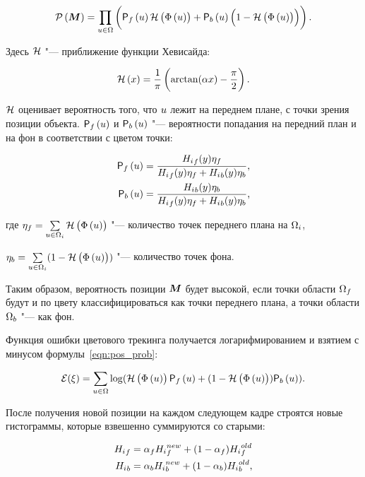\begin{equation}
\label{eqn:pos_prob}
    \mathcal{P} \left( \bm{M} \right)  = \prod\limits_{\mathnormal{u} \in \Omega} \left(
        \mathsf{P}_f \left( \mathnormal{u} \right) \mathcal{H} \left( \Phi \left( \mathnormal{u} \right) \right)
        + \mathsf{P}_b \left( \mathnormal{u} \right) \left( 1 - \mathcal{H} \left( \Phi \left( \mathnormal{u} \right) \right) \right)
    \right)
\text{.}
\end{equation}

Здесь $\mathcal{H}$ "--- приближение функции Хевисайда:

\begin{equation}
\label{eqn:heaviside}
    \mathcal{H} \left( x \right) = \frac{1}{\pi} \left( \arctan(\alpha x) - \frac{\pi}{2} \right)
\text{.}
\end{equation}

$\mathcal{H}$ оценивает вероятность того, что $\mathnormal{u}$ лежит на переднем плане, с точки
зрения позиции объекта.
$\mathsf{P}_f \left( \mathnormal{u} \right)$ и $\mathsf{P}_b \left( \mathnormal{u} \right)$ "--- вероятности попадания на передний план и 
на фон в соответствии с цветом точки:

\begin{align}
\label{eqn:Pfu}
    \mathsf{P}_f \left( \mathnormal{u} \right) &= \frac{{H_i}_f(y)\eta_f}{{H_i}_f(y)\eta_f +
        {H_i}_b(y)\eta_b} \text{,} \\
    \mathsf{P}_b \left( \mathnormal{u} \right) &=\frac{{H_i}_b(y)\eta_b}{{H_i}_f(y)\eta_f +
        {H_i}_b(y)\eta_b} \text{,}
\end{align}

где
$
    \eta_f = \sum\limits_{\mathnormal{u} \in \Omega_i}\mathcal{H} \left( \Phi \left( \mathnormal{u} \right) \right)
$ "--- количество точек переднего плана на $\Omega_i$,

$
    \eta_b = \sum\limits_{\mathnormal{u} \in \Omega_i}(1 - \mathcal{H} \left( \Phi \left( \mathnormal{u} \right) \right))
$ "--- количество точек фона.


Таким образом, вероятность позиции $\bm{M}$ будет высокой, если точки области
$\Omega_f$ будут и по цвету классифицироваться как точки переднего плана, а
точки области $\Omega_b$ "--- как фон.

Функция ошибки цветового трекинга получается логарифмированием и взятием с
минусом
формулы~\ref{eqn:pos_prob}:

\begin{equation}
\label{eqn:err_func}
\mathcal{E}(\xi) = \sum\limits_{\mathnormal{u} \in \Omega}
\log(\mathcal{H} \left( \Phi \left( \mathnormal{u} \right) \right) \mathsf{P}_f \left( \mathnormal{u} \right) + (1 - \mathcal{H} \left( \Phi \left( \mathnormal{u} \right) \right))\mathsf{P}_b \left( \mathnormal{u} \right))
\text{.}
\end{equation}

После получения новой позиции на каждом следующем кадре строятся новые
гистограммы, которые взвешенно суммируются со старыми: 

\begin{align}
    {\ensuremath{H_i}}_f &= \alpha_f {H_i}_f^{new} + (1 - \alpha_f) {H_i}_f^{old} \\
    {H_i}_b &= \alpha_b {H_i}_b^{new} + (1 - \alpha_b) {H_i}_b^{old}
\text{,}
\end{align}

